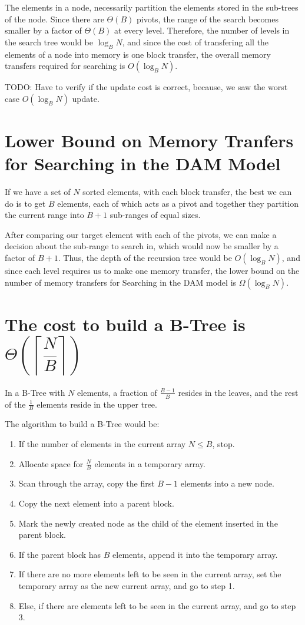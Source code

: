 \documentclass{article}
\begin{document}
The elements in a node, necessarily partition
the elements stored in the sub-trees of the node. Since there are $\Theta(B)$
pivots, the range of the search becomes smaller by a factor of $\Theta(B)$ at
every level. Therefore, the number of levels in the search tree would be 
$\log_B{N}$, and since the cost of transfering all the elements of a node into
memory is one block transfer, the overall memory transfers required for searching
is $O(\log_B{N})$.

TODO: Have to verify if the update cost is correct, because, we saw the worst
case $O(\log_B{N})$ update.

\clearpage 

\section {Lower Bound on Memory Tranfers for Searching in the DAM Model}
If we have a set of $N$ sorted elements, with each block transfer, the best we can
do is to get $B$ elements, each of which acts as a pivot and together they partition
the current range into $B+1$ sub-ranges of equal sizes. 

After comparing our target element with each of the pivots, we can make a decision
about the sub-range to search in, which would now be smaller by a factor of $B+1$.
Thus, the depth of the recursion tree would be $O(\log_B{N})$, and since each level
requires us to make one memory transfer, the lower bound on the number of memory
transfers for Searching in the DAM model is $\Omega(\log_B{N})$.

\clearpage

\section {The cost to build a B-Tree is $\Theta\left(\left\lceil\dfrac{N}{B}\right\rceil\right)$}
In a B-Tree with $N$ elements, a fraction of $\frac{B-1}{B}$ resides in the leaves, and
the rest of the $\frac{1}{B}$ elements reside in the upper tree. 

The algorithm to build a B-Tree would be:
\begin{enumerate}
\item If the number of elements in the current array $N \leq B $, stop.
\item Allocate space for $\frac{N}{B}$ elements in a temporary array.
\item Scan through the array, copy the first $B-1$ elements into a new node.
\item Copy the next element into a parent block. 
\item Mark the newly created node as the child of the element inserted in the parent block.
\item If the parent block has $B$ elements, append it into the temporary array.
\item If there are no more elements left to be seen in the current array, set the temporary
array as the new current array, and go to step 1.
\item Else, if there are elements left to be seen in the current array, and go to step 3.
\end{enumerate}
\end{document}
